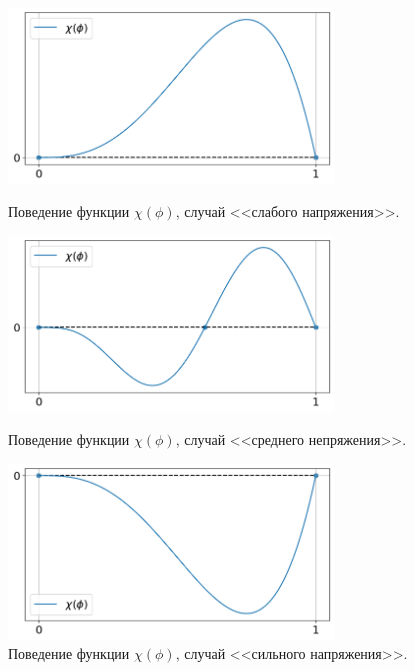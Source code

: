 \begin{figure}[!tp]
	\centering
	\includegraphics[width=0.77\textwidth]{figures/equilibriums_case_1.png}
	\vspace{-0.3cm}
	\caption{Поведение функции $\chi(\phi)$, случай <<слабого напряжения>>.}
	\label{fig:equilibriums_case_1}
	\vspace{0.7cm}
	
	\includegraphics[width=0.77\textwidth]{figures/equilibriums_case_2.png}
	\vspace{-0.3cm}
	\caption{Поведение функции $\chi(\phi)$, случай <<среднего непряжения>>.}
	\label{fig:equilibriums_case_2}
	\vspace{0.7cm}
	
	\includegraphics[width=0.77\textwidth]{figures/equilibriums_case_3.png}
	\vspace{-0.3cm}
	\caption{Поведение функции $\chi(\phi)$, случай <<сильного напряжения>>.}
	\label{fig:equilibriums_case_3}
\end{figure}